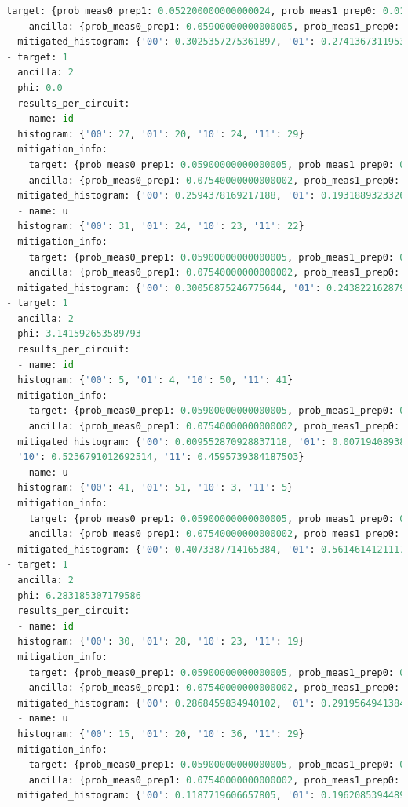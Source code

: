 \documentclass[preprint,12pt, a4paper, dvipsnames]{elsarticle}
\newcommand{\1}{{\rm 1\hspace{-0.9mm}l}}
\begin{document}
\begin{lstlisting}[language=Python]
	target: {prob_meas0_prep1: 0.052200000000000024, prob_meas1_prep0: 0.0172}
	ancilla: {prob_meas0_prep1: 0.05900000000000005, prob_meas1_prep0: 0.0202}
  mitigated_histogram: {'00': 0.3025357275361897, '01': 0.27413673119534815, '10': 0.24313373302688793, '11': 0.18019380824157433}
- target: 1
  ancilla: 2
  phi: 0.0
  results_per_circuit:
  - name: id
  histogram: {'00': 27, '01': 20, '10': 24, '11': 29}
  mitigation_info:
	target: {prob_meas0_prep1: 0.05900000000000005, prob_meas1_prep0: 0.0202}
	ancilla: {prob_meas0_prep1: 0.07540000000000002, prob_meas1_prep0: 0.0528}
  mitigated_histogram: {'00': 0.2594378169217188, '01': 0.19318893233269735, '10': 0.23035366874292057, '11': 0.3170195820026633}
  - name: u
  histogram: {'00': 31, '01': 24, '10': 23, '11': 22}
  mitigation_info:
	target: {prob_meas0_prep1: 0.05900000000000005, prob_meas1_prep0: 0.0202}
	ancilla: {prob_meas0_prep1: 0.07540000000000002, prob_meas1_prep0: 0.0528}
  mitigated_histogram: {'00': 0.30056875246775644, '01': 0.2438221628798003, '10': 0.22180309809696985, '11': 0.23380598655547338}
- target: 1
  ancilla: 2
  phi: 3.141592653589793
  results_per_circuit:
  - name: id
  histogram: {'00': 5, '01': 4, '10': 50, '11': 41}
  mitigation_info:
	target: {prob_meas0_prep1: 0.05900000000000005, prob_meas1_prep0: 0.0202}
	ancilla: {prob_meas0_prep1: 0.07540000000000002, prob_meas1_prep0: 0.0528}
  mitigated_histogram: {'00': 0.009552870928837118, '01': 0.007194089383161034,
  '10': 0.5236791012692514, '11': 0.4595739384187503}
  - name: u
  histogram: {'00': 41, '01': 51, '10': 3, '11': 5}
  mitigation_info:
	target: {prob_meas0_prep1: 0.05900000000000005, prob_meas1_prep0: 0.0202}
	ancilla: {prob_meas0_prep1: 0.07540000000000002, prob_meas1_prep0: 0.0528}
  mitigated_histogram: {'00': 0.4073387714165384, '01': 0.5614614121117936, '10': 0.006431862814564833, '11': 0.024767953657102992}
- target: 1
  ancilla: 2
  phi: 6.283185307179586
  results_per_circuit:
  - name: id
  histogram: {'00': 30, '01': 28, '10': 23, '11': 19}
  mitigation_info:
	target: {prob_meas0_prep1: 0.05900000000000005, prob_meas1_prep0: 0.0202}
	ancilla: {prob_meas0_prep1: 0.07540000000000002, prob_meas1_prep0: 0.0528}
  mitigated_histogram: {'00': 0.2868459834940102, '01': 0.2919564941384742, '10': 0.22466574543735374, '11': 0.19653177693016174}
  - name: u
  histogram: {'00': 15, '01': 20, '10': 36, '11': 29}
  mitigation_info:
	target: {prob_meas0_prep1: 0.05900000000000005, prob_meas1_prep0: 0.0202}
	ancilla: {prob_meas0_prep1: 0.07540000000000002, prob_meas1_prep0: 0.0528}
  mitigated_histogram: {'00': 0.1187719606657805, '01': 0.1962085394489247, '10': 0.3710195249988589, '11': 0.31399997488643583}
\end{lstlisting}
\end{document}
